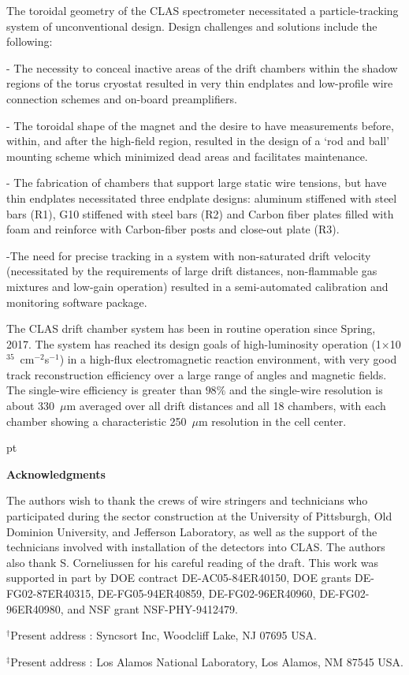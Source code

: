 \hskip 0.15in
The toroidal geometry of the CLAS spectrometer necessitated a particle-tracking 
system of unconventional design.  Design challenges and solutions include the following:

\vskip 10pt
\noindent
- The necessity to conceal inactive areas of the drift chambers within the
shadow regions of the torus cryostat resulted in very thin endplates and low-profile
wire connection schemes and on-board preamplifiers.

\noindent
- The toroidal shape of the magnet and the desire to have measurements before, within, 
and after the high-field region, resulted in the design of a `rod and ball' mounting scheme
which minimized dead areas and facilitates maintenance.

\noindent
- The fabrication of chambers that support large static wire tensions, but have thin 
endplates necessitated three endplate designs: aluminum stiffened with steel bars (R1),
G10 stiffened with steel bars (R2) and Carbon fiber plates filled with foam and reinforce
with Carbon-fiber posts and close-out plate (R3). 

\noindent
-The need for precise tracking in a system with non-saturated drift velocity 
(necessitated by the requirements of large drift distances, non-flammable gas mixtures 
and low-gain operation) resulted in a semi-automated calibration and monitoring software 
package.

\vskip 10pt
The CLAS drift chamber system has been in routine operation since Spring, 2017. 
The system has reached its design goals of 
high-luminosity operation (1$\times$10$^{35}$~cm$^{-2}$s$^{-1}$) in a 
high-flux electromagnetic reaction environment, with very good track 
reconstruction efficiency over a large range of angles and 
magnetic fields.  The single-wire efficiency is greater than $98\%$ and the
single-wire resolution is about 330~$\mu$m averaged over all drift distances and
all 18 chambers, with each chamber showing a characteristic 250~$\mu$m resolution 
in the cell center.

 pt

{\large{\bf Acknowledgments}}

\vskip 10pt

The authors wish to thank the crews of wire stringers and technicians who 
participated during the sector construction at the University of Pittsburgh,
Old Dominion University, and Jefferson Laboratory, as well as the support of 
the technicians involved with installation of the detectors into CLAS.  The
authors also thank S. Corneliussen for his careful reading of the draft.  This
work was supported in part by DOE contract DE-AC05-84ER40150, DOE grants 
DE-FG02-87ER40315, DE-FG05-94ER40859, DE-FG02-96ER40960, DE-FG02-96ER40980, 
and NSF grant NSF-PHY-9412479.

\vskip 10pt

\noindent
$^{\dagger}$Present address : Syncsort Inc, Woodcliff Lake, NJ 07695 USA.

\noindent
$^{\ddagger}$Present address : Los Alamos National Laboratory, Los Alamos, NM
87545 USA.



